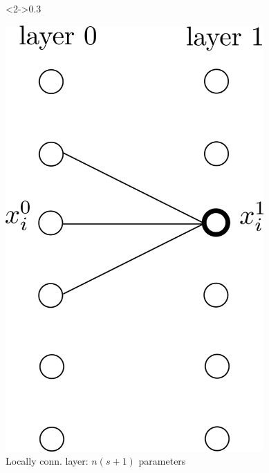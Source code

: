 \documentclass[xcolor=pdftex,dvipsnames,table,mathserif]{beamer}
\begin{document}
{\begin{columns}
    \begin{column}<2->{0.3\textwidth}
      \begin{center}
        \includegraphics[width=0.74\textwidth]{locally_connected_layer.png}
        \\ \scriptsize{Locally conn. layer: $n(s+1)$ parameters}
      \end{center}
    \end{column}


\end{columns}}
\end{document}
